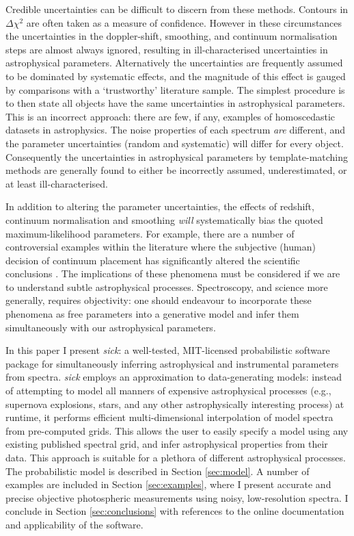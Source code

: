 \documentclass{aastex}
\newcommand{\sick}{\textit{sick}}
\begin{document}
Credible uncertainties can be difficult to discern from these methods. Contours in $\Delta\chi^2$ are often taken as a measure of confidence. However in these circumstances the uncertainties in the doppler-shift, smoothing, and continuum normalisation steps are almost always ignored, resulting in ill-characterised uncertainties in astrophysical parameters. Alternatively the uncertainties are frequently assumed to be dominated by systematic effects, and the magnitude of this effect is gauged by comparisons with a `trustworthy' literature sample. The simplest procedure is to then state all objects have the same uncertainties in astrophysical parameters. This is an incorrect approach: there are few, if any, examples of homoscedastic datasets in astrophysics. The noise properties of each spectrum \textit{are} different, and the parameter uncertainties (random and systematic) will differ for every object. Consequently the uncertainties in astrophysical parameters by template-matching methods are generally found to either be incorrectly assumed, underestimated, or at least ill-characterised. 

In addition to altering the parameter uncertainties, the effects of redshift, continuum normalisation and smoothing \textit{will} systematically bias the quoted maximum-likelihood parameters. For example, there are a number of controversial examples within the literature where the subjective (human) decision of continuum placement has significantly altered the scientific conclusions \citep[e.g., see][]{kerzendorf}. The implications of these phenomena must be considered if we are to understand subtle astrophysical processes. Spectroscopy, and science more generally, requires objectivity: one should endeavour to incorporate these phenomena as free parameters into a generative model and infer them simultaneously with our astrophysical parameters.

In this paper I present \sick{}: a well-tested, MIT-licensed probabilistic software package for simultaneously inferring astrophysical and instrumental parameters from spectra. \sick{} employs an approximation to data-generating models: instead of attempting to model all manners of expensive astrophysical processes (e.g., supernova explosions, stars, and any other astrophysically interesting process) at runtime, it performs efficient multi-dimensional interpolation of model spectra from pre-computed grids. This allows the user to easily specify a model using any existing published spectral grid, and infer astrophysical properties from their data. This approach is suitable for a plethora of different astrophysical processes. The probabilistic model is described in Section \ref{sec:model}. A number of examples are included in Section \ref{sec:examples}, where I present accurate and precise objective photospheric measurements using noisy, low-resolution spectra. I conclude in Section \ref{sec:conclusions} with references to the online documentation and applicability of the software.
\end{document}
